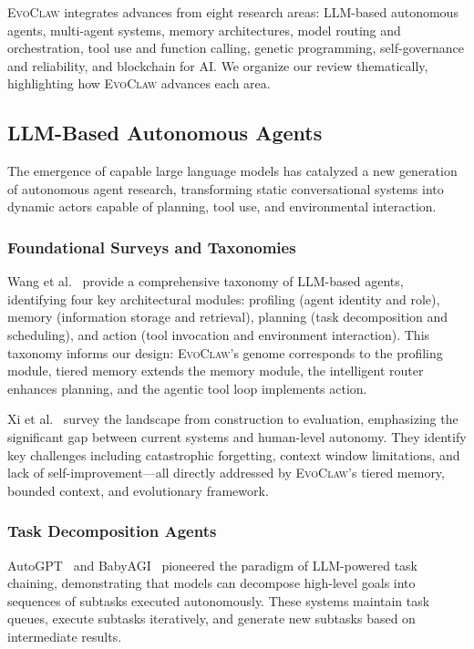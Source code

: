 \documentclass{article}
\newcommand{\evoclaw}{\textsc{EvoClaw}}
\begin{document}
\evoclaw{} integrates advances from eight research areas: LLM-based autonomous agents, multi-agent systems, memory architectures, model routing and orchestration, tool use and function calling, genetic programming, self-governance and reliability, and blockchain for AI. We organize our review thematically, highlighting how \evoclaw{} advances each area.

\subsection{LLM-Based Autonomous Agents}

The emergence of capable large language models has catalyzed a new generation of autonomous agent research, transforming static conversational systems into dynamic actors capable of planning, tool use, and environmental interaction.

\subsubsection{Foundational Surveys and Taxonomies}

Wang et al.~\cite{wang2023survey} provide a comprehensive taxonomy of LLM-based agents, identifying four key architectural modules: profiling (agent identity and role), memory (information storage and retrieval), planning (task decomposition and scheduling), and action (tool invocation and environment interaction). This taxonomy informs our design: \evoclaw{}'s genome corresponds to the profiling module, tiered memory extends the memory module, the intelligent router enhances planning, and the agentic tool loop implements action.

Xi et al.~\cite{xi2023rise} survey the landscape from construction to evaluation, emphasizing the significant gap between current systems and human-level autonomy. They identify key challenges including catastrophic forgetting, context window limitations, and lack of self-improvement—all directly addressed by \evoclaw{}'s tiered memory, bounded context, and evolutionary framework.

\subsubsection{Task Decomposition Agents}

AutoGPT~\cite{auto_gpt} and BabyAGI~\cite{babyagi} pioneered the paradigm of LLM-powered task chaining, demonstrating that models can decompose high-level goals into sequences of subtasks executed autonomously. These systems maintain task queues, execute subtasks iteratively, and generate new subtasks based on intermediate results.
\end{document}
